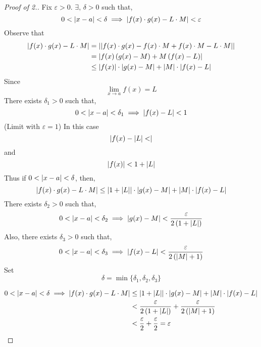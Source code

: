 \documentclass[12pt]{report}
\begin{document}
    \label{Properties of limits multiplication}
    \begin{proof}[Proof of \textnormal{2.}]
        Fix \(\varepsilon > 0\). \(\exists, \, \delta > 0\) such that,
        \[0 < \left| x - a \right| < \delta \implies \left| f(x) \cdot g(x) - L \cdot M \right| < \varepsilon\]
        Observe that 
        \begin{align*}
            \left| f(x) \cdot g(x) - L \cdot M \right| &= \left| \left| f(x) \cdot g(x) - f(x) \cdot M + f(x) \cdot M - L \cdot M \right| \right|\\
            &= \left| f(x)\left(g(x) - M\right) + M\left(f(x) - L\right) \right|\\
            &\leq \left| f(x) \right| \cdot \left| g(x) - M \right| + \left| M \right| \cdot \left| f(x) - L \right|
        \end{align*}
        Since 
        \[\lim _{x \to a} f(x) = L\]
        There exists \(\delta_1 > 0\) such that,
        \[0 < \left| x-a \right| < \delta_1 \implies \left| f(x) - L \right| < 1\]
        (Limit with \(\varepsilon = 1\))
        In this case 
        \[\left| f(x) - \left| L \right| < \right|\]
        and
        \[\left| f(x) \right| < 1 + \left| L \right|\]
        Thus if \(0 < \left| x-a \right|< \delta\), then,
        \[\left| f(x) \cdot g(x) - L \cdot M \right| \leq \left| 1 + \left| L \right| \right| \cdot \left| g(x) - M \right| + \left| M \right| \cdot \left| f(x) - L \right|\]
        There exists \(\delta_2 > 0\) such that,
        \[0 < \left| x-a \right| < \delta_2 \implies \left| g(x) - M \right| < \frac{\varepsilon}{2\left(1 + \left| L \right|\right)}\]
        Also, there exists \(\delta_3 > 0\) such that,
        \[0 < \left| x-a \right| < \delta_3 \implies \left| f(x) - L \right| < \frac{\varepsilon}{2\left(\left| M \right| + 1\right)}\]
        Set
        \[\delta = \min\{\delta_1,\delta_2,\delta_3\}\]

        \begin{align*}
            0 < \left| x - a \right| < \delta \implies \left| f(x) \cdot g(x) - L \cdot M \right| &\leq \left| 1 + \left| L \right| \right| \cdot \left| g(x) - M \right| + \left| M \right| \cdot \left| f(x) - L \right|\\
            &< \frac{\varepsilon}{2\left(1 + \left| L \right|\right)} + \frac{\varepsilon}{2\left(\left| M \right| + 1\right)}\\ 
            &< \frac{\varepsilon}{2} + \frac{\varepsilon}{2} = \varepsilon
        \end{align*}
    \end{proof}
    \label{Properties of limits division}
\end{document}
